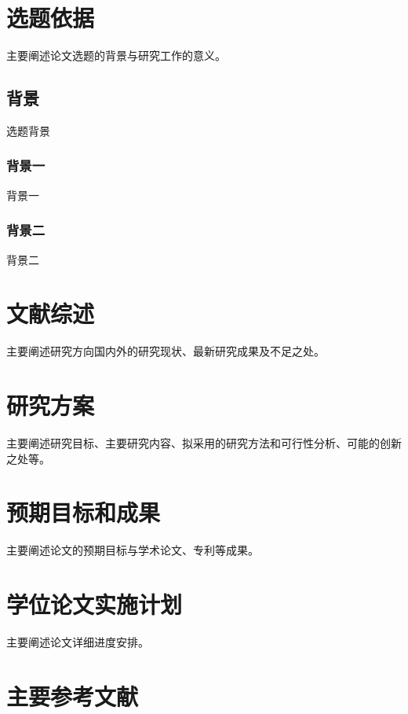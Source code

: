 \documentclass[master,openright,AutoFakeBold=true]{buaathesisproposal}
\begin{document}


\maketitle
\makecontents

\pagestyle{mainmatter}

\section{选题依据}
主要阐述论文选题的背景与研究工作的意义。
\subsection{背景}
选题背景
\subsubsection{背景一}
背景一
\subsubsection{背景二}
背景二

\section{文献综述}
主要阐述研究方向国内外的研究现状、最新研究成果及不足之处。
\section{研究方案}
主要阐述研究目标、主要研究内容、拟采用的研究方法和可行性分析、可能的创新之处等。
\section{预期目标和成果}
主要阐述论文的预期目标与学术论文、专利等成果。
\section{学位论文实施计划}
主要阐述论文详细进度安排。
\section{主要参考文献}
\nocite{*}

\end{document}
